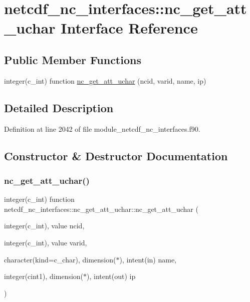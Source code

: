 \hypertarget{interfacenetcdf__nc__interfaces_1_1nc__get__att__uchar}{}\section{netcdf\+\_\+nc\+\_\+interfaces\+:\+:nc\+\_\+get\+\_\+att\+\_\+uchar Interface Reference}
\label{interfacenetcdf__nc__interfaces_1_1nc__get__att__uchar}
\subsection*{Public Member Functions}
\begin{DoxyCompactItemize}
\item 
integer(c\+\_\+int) function \hyperlink{interfacenetcdf__nc__interfaces_1_1nc__get__att__uchar_ab6c788040e66943bc447c9eba9ea293a}{nc\+\_\+get\+\_\+att\+\_\+uchar} (ncid, varid, name, ip)
\end{DoxyCompactItemize}


\subsection{Detailed Description}


Definition at line 2042 of file module\+\_\+netcdf\+\_\+nc\+\_\+interfaces.\+f90.



\subsection{Constructor \& Destructor Documentation}
\mbox{\label{interfacenetcdf__nc__interfaces_1_1nc__get__att__uchar_ab6c788040e66943bc447c9eba9ea293a}} 
\subsubsection{\texorpdfstring{nc\+\_\+get\+\_\+att\+\_\+uchar()}{nc\_get\_att\_uchar()}}
{\footnotesize\ttfamily integer(c\+\_\+int) function netcdf\+\_\+nc\+\_\+interfaces\+::nc\+\_\+get\+\_\+att\+\_\+uchar\+::nc\+\_\+get\+\_\+att\+\_\+uchar (\begin{DoxyParamCaption}\item[{integer(c\+\_\+int), value}]{ncid,  }\item[{integer(c\+\_\+int), value}]{varid,  }\item[{character(kind=c\+\_\+char), dimension($\ast$), intent(in)}]{name,  }\item[{integer(cint1), dimension($\ast$), intent(out)}]{ip }\end{DoxyParamCaption})}



